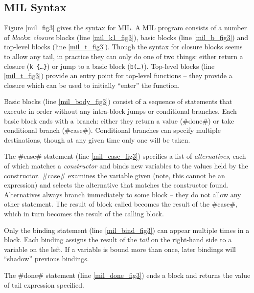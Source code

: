 \documentclass[12pt]{report}
\begin{document}
\subsection*{MIL Syntax}

Figure \ref{mil_fig3} gives the syntax for MIL.  A MIL program
consists of a number of \emph{blocks}: \emph{closure} blocks (line
\ref{mil_k1_fig3}), basic blocks (line \ref{mil_b_fig3}) and top-level
blocks (line \ref{mil_t_fig3}). Though the syntax for closure blocks
seems to allow any tail, in practice they can only do one of two
things: either return a closure (\texttt{k \{\dots\}}) or jump to a
basic block (\texttt{b(\dots)}). Top-level blocks (line
\ref{mil_t_fig3}) provide an entry point for top-level functions --
they provide a closure which can be used to initially ``enter'' the
function.

\afterpage{\clearpage{}\clearpage}

Basic blocks (line \ref{mil_body_fig3}) consist of a sequence of statements that
execute in order without any intra-block jumps or conditional
branches. Each basic block ends with a branch: either they return a
value (#done#) or take conditional branch (#case#). Conditional
branches can specify multiple destinations, though at any given time
only one will be taken.

The #case# statement (line \ref{mil_case_fig3}) specifies a list of
\emph{alternatives}, each of which matches a \emph{constructor} and
binds new variables to the values held by the constructor. #case#
examines the variable given (note, this cannot be an expression) and
selects the alternative that matches the constructor
found. Alternatives always branch immediately to some block -- they do
not allow any other statement. The result of block called becomes the
result of the #case#, which in turn becomes the result of the calling
block.

Only the binding statement (line \ref{mil_bind_fig3}) can appear multiple
times in a block. Each binding assigns the result of the \emph{tail}
on the right-hand side to a variable on the left. If a variable is
bound more than once, later bindings will ``shadow'' previous
bindings.

The #done# statement (line \ref{mil_done_fig3}) ends a block and returns
the value of tail expression specified.
\end{document}
